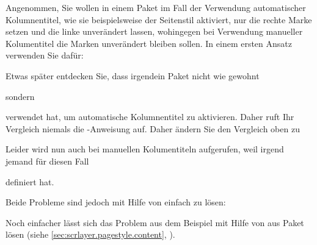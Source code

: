 \begin{Example}
  Angenommen, Sie wollen in einem Paket im Fall der Verwendung automatischer
  Kolumnentitel, wie sie beispielsweise der Seitenstil
   aktiviert, nur die rechte
  Marke setzen und die linke unverändert lassen, wohingegen bei Verwendung
  manueller Kolumentitel die Marken unverändert bleiben sollen. In einem
  ersten Ansatz verwenden Sie dafür:
\begin{lstcode}
  \ifx\@mkboth\markboth {}\fi
\end{lstcode}
  Etwas später entdecken Sie, dass irgendein Paket nicht wie gewohnt
\begin{lstcode}
  \let\@mkboth\markboth
\end{lstcode}
  sondern
\begin{lstcode}
  \renewcommand{\@mkboth}{\markboth}
\end{lstcode}
  verwendet hat, um automatische Kolumnentitel zu aktivieren. Daher ruft Ihr
  Vergleich niemals die -Anweisung auf.  Daher
  ändern Sie den Vergleich oben zu
\begin{lstcode}
  \ifx\@mkboth\@gobbletwo
  \else {}\fi
\end{lstcode}
  Leider wird nun  auch bei manuellen
  Kolumentiteln aufgerufen, weil irgend jemand für diesen Fall
\begin{lstcode}
  \renewcommand{\@mkboth}[2]{%
    \typeout{DEBUG: ignoring running head setting}%
  }
\end{lstcode}
  definiert hat.

  Beide Probleme sind jedoch mit Hilfe von  einfach zu lösen:
\begin{lstcode}
\end{lstcode}%
\end{Example}
Noch einfacher lässt sich das Problem aus dem Beispiel %
%
mit Hilfe von  aus Paket
\hyperref[cha:scrlayer]{} lösen (siehe
\autoref{sec:scrlayer.pagestyle.content},
).%
\EndIndexGroup


